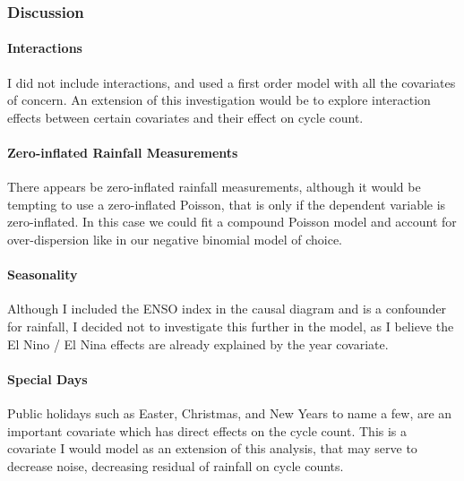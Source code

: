 \documentclass[
]{article}
\begin{document}
\hypertarget{discussion}{%
\subsubsection{Discussion}\label{discussion}}

\hypertarget{interactions}{%
\paragraph{Interactions}\label{interactions}}

I did not include interactions, and used a first order model with all
the covariates of concern. An extension of this investigation would be
to explore interaction effects between certain covariates and their
effect on cycle count.

\hypertarget{zero-inflated-rainfall-measurements}{%
\paragraph{Zero-inflated Rainfall
Measurements}\label{zero-inflated-rainfall-measurements}}

There appears be zero-inflated rainfall measurements, although it would
be tempting to use a zero-inflated Poisson, that is only if the
dependent variable is zero-inflated. In this case we could fit a
compound Poisson model and account for over-dispersion like in our
negative binomial model of choice.

\hypertarget{seasonality}{%
\paragraph{Seasonality}\label{seasonality}}

Although I included the ENSO index in the causal diagram and is a
confounder for rainfall, I decided not to investigate this further in
the model, as I believe the El Nino / El Nina effects are already
explained by the year covariate.

\hypertarget{special-days}{%
\paragraph{Special Days}\label{special-days}}

Public holidays such as Easter, Christmas, and New Years to name a few,
are an important covariate which has direct effects on the cycle count.
This is a covariate I would model as an extension of this analysis, that
may serve to decrease noise, decreasing residual of rainfall on cycle
counts.
\end{document}
